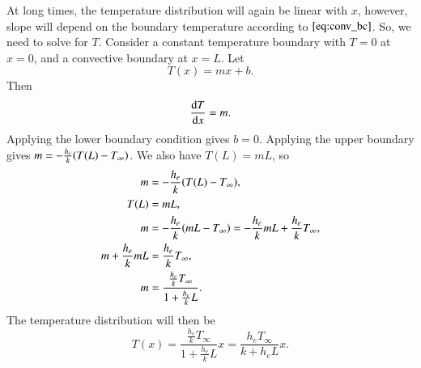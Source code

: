 \documentclass[letterpaper,12pt]{article}
\begin{document}
At long times, the temperature distribution will again be linear with $x$, however, slope will depend on the boundary temperature
according to $\ref{eq:conv_bc}$. So, we need to solve for $T$. Consider a constant temperature boundary with $T = 0$ at $x = 0$, and a convective
boundary at $x = L$. Let
\begin{equation}
  T(x) = mx + b.
\end{equation}
Then
\begin{equation}
  \dv{T}{x} = m.
\end{equation}
Applying the lower boundary condition gives $b = 0$. Applying the upper boundary gives $m = -\frac{h_e}{k}\qty(T(L) - T_\infty)$. We also have
$T(L) = mL$, so
\begin{align}
  m &= -\frac{h_e}{k}\qty(T(L) - T_\infty), \\
  T(L) &= mL,\\
  m &= -\frac{h_e}{k}\qty( mL- T_\infty) = -\frac{h_e}{k}mL + \frac{h_e}{k} T_\infty, \\
  m + \frac{h_e}{k} mL  &= \frac{h_e}{k}T_\infty , \\
  m &= \frac{ \frac{h_e}{k}T_\infty }{1 + \frac{h_e}{k} L}.
\end{align}
The temperature distribution will then be
\begin{equation}
  T(x) = \frac{ \frac{h_e}{k}T_\infty }{1 + \frac{h_e}{k} L} x 
  = \frac{ h_e T_\infty }{k + h_e L} x.
\end{equation}
\end{document}
